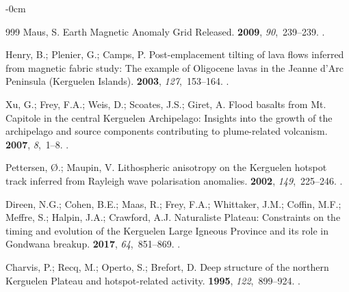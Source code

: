 \documentclass[geomatics,article,accept,pdftex,moreauthors]{Definitions/mdpi}
\begin{document}
\begin{adjustwidth}{-\extralength}{0cm}
\begin{thebibliography}{999}
Maus, S.
\newblock Earth Magnetic Anomaly Grid Released.
 {\bf 2009}, {\em
  90},~239--239.
.

Henry, B.; Plenier, G.; Camps, P.
\newblock Post-emplacement tilting of lava flows inferred from magnetic fabric
  study: The example of Oligocene lavas in the Jeanne d’Arc Peninsula
  (Kerguelen Islands).
 {\bf 2003}, {\em
  127},~153--164.
.

Xu, G.; Frey, F.A.; Weis, D.; Scoates, J.S.; Giret, A.
\newblock Flood basalts from Mt. Capitole in the central Kerguelen Archipelago:
  Insights into the growth of the archipelago and source components
  contributing to plume-related volcanism.
 {\bf 2007}, \emph{8},~1--8. %
.

Pettersen, {\O}.; Maupin, V.
\newblock Lithospheric anisotropy on the Kerguelen hotspot track inferred from
  Rayleigh wave polarisation anomalies.
 {\bf 2002}, {\em
  149},~225--246.
.

Direen, N.G.; Cohen, B.E.; Maas, R.; Frey, F.A.; Whittaker, J.M.; Coffin, M.F.;
  Meffre, S.; Halpin, J.A.; Crawford, A.J.
\newblock Naturaliste Plateau: Constraints on the timing and evolution of the
  Kerguelen Large Igneous Province and its role in Gondwana breakup.
 {\bf 2017}, {\em
  64},~851--869.
.

Charvis, P.; Recq, M.; Operto, S.; Brefort, D.
\newblock Deep structure of the northern Kerguelen Plateau and hotspot-related
  activity.
 {\bf 1995}, {\em
  122},~899--924.
.


\end{thebibliography}
\end{adjustwidth}
\end{document}
